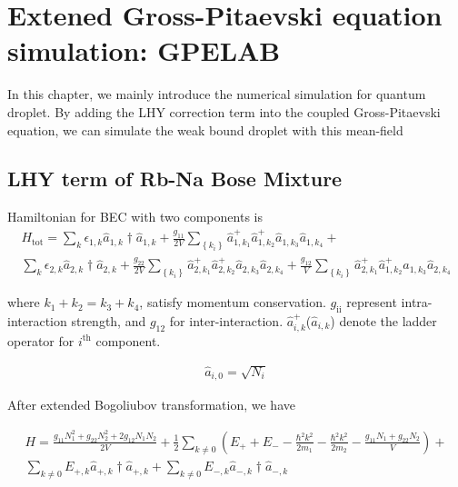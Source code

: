 \chapter{Extened Gross-Pitaevski equation simulation: GPELAB}
\label{chap:eGPELAB}

In this chapter, we mainly introduce the numerical simulation for quantum droplet. By adding the LHY correction term into the coupled Gross-Pitaevski equation, we can simulate the weak bound droplet with this mean-field 

\section{LHY term of Rb-Na Bose Mixture}
Hamiltonian for BEC with two components is
\begin{equation}
\begin{split}
H_{\text{tot}}=\sum _k \epsilon _{1,k}\hat{a}_{1,k}\dagger\hat{a}_{1,k}+\frac{g_{11}}{2V}\sum _{\left\{k_i\right\}} \hat{a}_{1,k_1}^+\hat{a}_{1,k_2}^+\hat{a}_{1,k_3}\hat{a}_{1,k_4}+\\
\sum_k \epsilon _{2,k}\hat{a}_{2,k}\dagger\hat{a}_{2,k}+\frac{g_{22}}{2V}\sum _{\left\{k_i\right\}} \hat{a}_{2,k_1}^+\hat{a}_{2,k_2}^+\hat{a}_{2,k_3}\hat{a}_{2,k_4}+\frac{g_{12}}{V}\sum
_{\left\{k_i\right\}} \hat{a}_{2,k_1}^+\hat{a}_{1,k_2}^+\hat{a}_{1,k_3}\hat{a}_{2,k_4}
\end{split}
\end{equation}

where \(k_1+k_2=k_3+k_4\), satisfy momentum conservation. \(g_{\text{ii}}\) represent intra-interaction strength, and \(g_{12}\) for inter-interaction.
\(\hat{a}_{i,k}^+\)(\(\hat{a}_{i,k}\)) denote the ladder operator for \(i^{\text{th}}\) component.

\begin{equation}
\begin{split}
\hat{a}_{i,0}=\sqrt{N_i}
\end{split}
\end{equation}

After extended Bogoliubov transformation, we have

\begin{equation}
\begin{split}
H=\frac{g_{11}N_1^2+g_{22}N_2^2+2g_{12}N_1N_2}{2V}+\frac{1}{2}\sum _{k\neq 0} \left(E_++E_--\frac{\hbar ^2k^2}{2m_1}-\frac{\hbar ^2k^2}{2m_2}-\frac{g_{11}N_1+g_{22}N_2}{V}\right)+\\
\sum_{k\neq 0} E_{+,k}\hat{a}_{+,k}\dagger\hat{a}_{+,k}+\sum _{k\neq 0} E_{-,k}\hat{a}_{-,k}\dagger\hat{a}_{-,k}
\end{split}
\end{equation}

